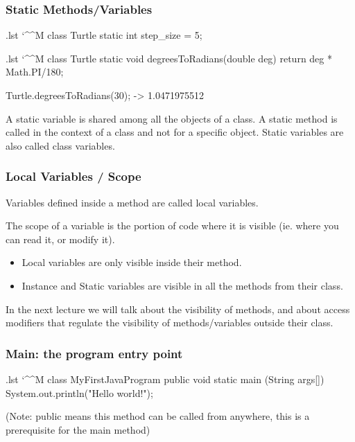 \documentclass[10pt]{beamer}
\makeatletter
\newenvironment{code}{%
  \begingroup
  \@bsphack
  \immediate\openout\lstvrb@out\jobname.lst
  \let\do\@makeother\dospecials\catcode`\^^M\active
  \def\verbatim@processline{%
    \immediate\write\lstvrb@out{\the\verbatim@line}}%
  \verbatim@start}{%
  \immediate\closeout\lstvrb@out
  \@esphack
  \endgroup
  
  \begin{alertblock}{}
    
  \end{alertblock}}
\makeatother
\begin{document}
\begin{frame}
  \frametitle{Static Methods/Variables}
    \begin{code}
class Turtle {
  static int step_size = 5;
}
    \end{code}
    \pause
    \begin{code}
class Turtle {
  static void degreesToRadians(double deg) { 
    return deg * Math.PI/180; 
  }
}

Turtle.degreesToRadians(30); -> 1.0471975512

    \end{code}
    \pause
    \begin{definition}
      A static variable is shared among all the objects of a class.
      A static method is called in the context of a class and not for a specific object.
      Static variables are also called class variables.
    \end{definition}
\end{frame}

\begin{frame}
  \frametitle{Local Variables / Scope}
  \begin{definition}
    Variables defined inside a method are called local variables.

    The scope of a variable is the portion of code where it is visible (ie. where you can read it, 
    or modify it).
   \end{definition}
   
    \begin{itemize}
      \item Local variables are only visible inside their method.
      \item Instance and Static variables are visible in all the methods from their class.
    \end{itemize}

    In the next lecture we will talk about the visibility of methods, and about access modifiers
    that regulate the visibility of methods/variables outside their class. 
\end{frame}


\begin{frame}[fragile]
  \frametitle{Main: the program entry point}
  \begin{code}
    class MyFirstJavaProgram{
      public void static main (String args[]) {
        System.out.println("Hello world!");
      }
    }
  \end{code}
  (Note: public means this method can be called from anywhere, this is a prerequisite for
   the main method) 
\end{frame}
\end{document}
